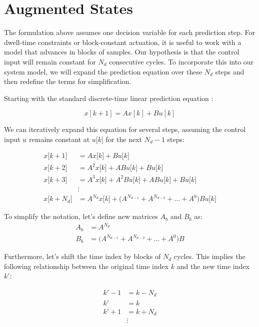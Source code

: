 \section{Augmented States}
\label{sec:cap3:augmented-states}

The formulation above assumes one decision variable for each prediction step. For dwell-time constraints or block-constant actuation, it is useful to work with a model that advances in blocks of samples. Our hypothesis is that the control input will remain constant for $N_d$ consecutive cycles. To 
incorporate this into our system model, we will expand the prediction equation over these $N_d$ 
steps and then redefine the terms for simplification.

Starting with the standard discrete-time linear prediction equation :

\noindent
\begin{equation}
    x[k + 1] = A x[k] + B u[k] \nonumber
\end{equation}

We can iteratively expand this equation for several steps, assuming the control 
input $u$ remains constant at $u\big[k\big]$ for the next $N_d - 1$ steps:

\noindent
\begin{align}
    x\big[k+1\big] &= A x\big[k\big] + B u\big[k\big] \nonumber \\
    x\big[k+2\big] &= A^2 x\big[k\big] + AB u\big[k\big] + B u\big[k\big] \nonumber \\
    x\big[k+3\big] &= A^3 x\big[k\big] + A^2B u\big[k\big]+ AB u\big[k\big] + B u\big[k\big] \nonumber \\
    &\vdots \nonumber \\
    x\big[k+N_d\big] &= A^{N_d} x\big[k\big] + \big(A^{N_{d-1}} + A^{N_{d-2}} + \dots +  A^0 \big)Bu\big[k\big]
\end{align}

To simplify the notation, let's define new matrices $A_b$ and $B_b$ as:
\noindent
\begin{align}
    A_b &= A^{N_d} \\
    B_b &= \big(A^{N_{d-1}} + A^{N_{d-2}} + \dots +  A^0 \big)B
\end{align}

Furthermore, let's shift the time index by blocks of $N_d$ cycles. This implies the following relationship between 
the original time index $k$ and the new time index $k'$:

\noindent
\begin{align*}
    k' - 1 &= k - N_d \\
    k' &= k \\
    k' + 1 &= k + N_d \\
    &\vdots
\end{align*}

